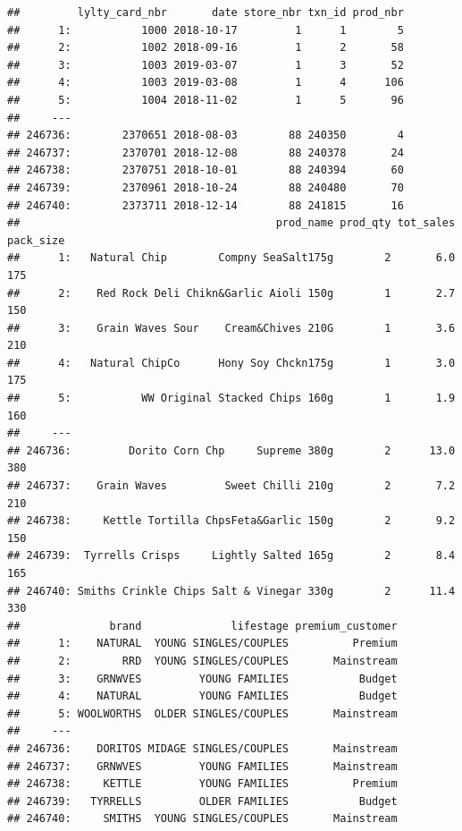 \documentclass[
]{article}
\begin{document}
\begin{verbatim}
##         lylty_card_nbr       date store_nbr txn_id prod_nbr
##      1:           1000 2018-10-17         1      1        5
##      2:           1002 2018-09-16         1      2       58
##      3:           1003 2019-03-07         1      3       52
##      4:           1003 2019-03-08         1      4      106
##      5:           1004 2018-11-02         1      5       96
##     ---                                                    
## 246736:        2370651 2018-08-03        88 240350        4
## 246737:        2370701 2018-12-08        88 240378       24
## 246738:        2370751 2018-10-01        88 240394       60
## 246739:        2370961 2018-10-24        88 240480       70
## 246740:        2373711 2018-12-14        88 241815       16
##                                        prod_name prod_qty tot_sales pack_size
##      1:   Natural Chip        Compny SeaSalt175g        2       6.0       175
##      2:    Red Rock Deli Chikn&Garlic Aioli 150g        1       2.7       150
##      3:    Grain Waves Sour    Cream&Chives 210G        1       3.6       210
##      4:   Natural ChipCo      Hony Soy Chckn175g        1       3.0       175
##      5:           WW Original Stacked Chips 160g        1       1.9       160
##     ---                                                                      
## 246736:         Dorito Corn Chp     Supreme 380g        2      13.0       380
## 246737:    Grain Waves         Sweet Chilli 210g        2       7.2       210
## 246738:     Kettle Tortilla ChpsFeta&Garlic 150g        2       9.2       150
## 246739:  Tyrrells Crisps     Lightly Salted 165g        2       8.4       165
## 246740: Smiths Crinkle Chips Salt & Vinegar 330g        2      11.4       330
##              brand              lifestage premium_customer
##      1:    NATURAL  YOUNG SINGLES/COUPLES          Premium
##      2:        RRD  YOUNG SINGLES/COUPLES       Mainstream
##      3:    GRNWVES         YOUNG FAMILIES           Budget
##      4:    NATURAL         YOUNG FAMILIES           Budget
##      5: WOOLWORTHS  OLDER SINGLES/COUPLES       Mainstream
##     ---                                                   
## 246736:    DORITOS MIDAGE SINGLES/COUPLES       Mainstream
## 246737:    GRNWVES         YOUNG FAMILIES       Mainstream
## 246738:     KETTLE         YOUNG FAMILIES          Premium
## 246739:   TYRRELLS         OLDER FAMILIES           Budget
## 246740:     SMITHS  YOUNG SINGLES/COUPLES       Mainstream
\end{verbatim}
\end{document}
